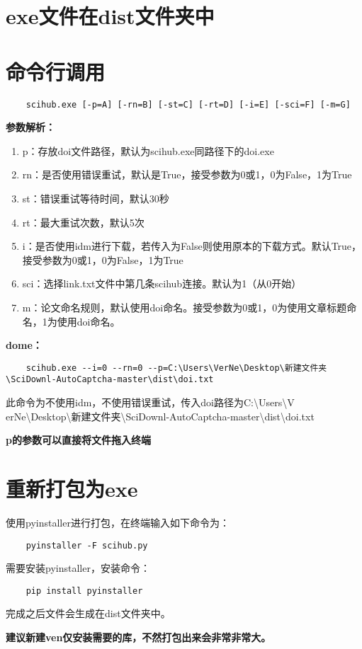 \documentclass{jnuthesis}
\begin{document}
\renewcommand{\title}{使用说明} %
\renewcommand{\biaoti}{使用说明}  %
\renewcommand{\xueyuan}{国际能源学院}
\renewcommand{\zhuanye}{电气工程及其自动化}
\renewcommand{\xingming}{余思贤}
\renewcommand{\xuehao}{2018054439}
\renewcommand{\daoshi}{莫维科}

\chapter*{exe文件在dist文件夹中}
\chapter{命令行调用}
\begin{lstlisting} 
	scihub.exe [-p=A] [-rn=B] [-st=C] [-rt=D] [-i=E] [-sci=F] [-m=G]
\end{lstlisting}

\textbf{参数解析：}
\begin{enumerate}
	\item p：存放doi文件路径，默认为scihub.exe同路径下的doi.exe
	\item rn：是否使用错误重试，默认是True，接受参数为0或1，0为False，1为True
	\item st：错误重试等待时间，默认30秒
	\item rt：最大重试次数，默认5次
	\item i：是否使用idm进行下载，若传入为False则使用原本的下载方式。默认True，接受参数为0或1，0为False，1为True
	\item sci：选择link.txt文件中第几条scihub连接。默认为1（从0开始）
	\item m：论文命名规则，默认使用doi命名。接受参数为0或1，0为使用文章标题命名，1为使用doi命名。
\end{enumerate}

\textbf{dome：}
\begin{lstlisting}
	scihub.exe --i=0 --rn=0 --p=C:\Users\VerNe\Desktop\新建文件夹\SciDownl-AutoCaptcha-master\dist\doi.txt
\end{lstlisting}

此命令为不使用idm，不使用错误重试，传入doi路径为C:\textbackslash Users\textbackslash V\\erNe\textbackslash Desktop\textbackslash 新建文件夹\textbackslash SciDownl-AutoCaptcha-master\textbackslash dist\textbackslash doi.txt

\textbf{p的参数可以直接将文件拖入终端}

\chapter{重新打包为exe}

使用pyinstaller进行打包，在终端输入如下命令为：
\begin{lstlisting} 
	pyinstaller -F scihub.py
\end{lstlisting}

需要安装pyinstaller，安装命令：
\begin{lstlisting} 
	pip install pyinstaller
\end{lstlisting}

完成之后文件会生成在dist文件夹中。

\textbf{建议新建ven仅安装需要的库，不然打包出来会非常非常大。}
\end{document}
